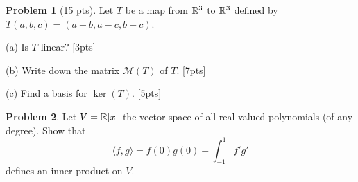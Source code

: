 \documentclass[12pt]{amsart}
\theoremstyle{definition}
\newtheorem{prob}{Problem}
\begin{document}
\newpage

\begin{prob}[15 pts]
Let $T$ be a map from $\mathbb{R}^3$ to $\mathbb{R}^3$ defined by $T(a,b,c)=(a+b,a-c,b+c)$.

(a) Is $T$ linear? [3pts]\vspace{5cm}

(b) Write down the matrix $\mathcal{M}(T)$ of $T$. [7pts]\vspace{8cm}

(c) Find a basis for $\ker(T)$. [5pts]
	
\end{prob}
\newpage

\begin{prob}
	Let $V=\mathbb{R}[x]$ the vector space of all real-valued polynomials (of any degree). Show that $$\langle f,g\rangle =f(0)g(0) +\int_{-1}^{1}f'g'$$ 
	defines an inner product on $V$.
\end{prob}
\end{document}

